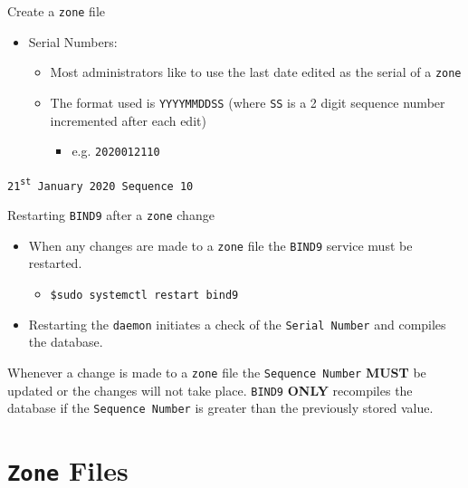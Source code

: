 \documentclass[xcolor=table]{beamer}
\begin{document}
\begin{frame}{Create a \texttt{zone} file}
  \begin{itemize}
    \item Serial Numbers:
      \begin{itemize}
        \item Most administrators like to use the last date edited as the serial of a \texttt{zone}
        \item The format used is \texttt{YYYYMMDDSS} (where \texttt{SS} is a 2 digit sequence number incremented after each edit)
          \begin{itemize}
            \item e.g. \texttt{2020012110}
          \end{itemize}
      \end{itemize}
  \end{itemize}
  \begin{tcolorbox}
    \begin{center}
      \texttt{21\textsuperscript{st} January 2020 Sequence 10}
    \end{center}
  \end{tcolorbox}
\end{frame}

\begin{frame}{Restarting \texttt{BIND9} after a \texttt{zone} change}
  \begin{itemize}
    \item When any changes are made to a \texttt{zone} file the \texttt{BIND9} service must be restarted.
      \begin{itemize}
        \item \texttt{\$sudo systemctl restart bind9}
      \end{itemize}
    \item Restarting the \texttt{daemon} initiates a check of the \texttt{Serial Number} and compiles the database.
  \end{itemize}
  \begin{tcolorbox}[title={\textbf{NOTE:}}]
    Whenever a change is made to a \texttt{zone} file the \texttt{Sequence Number} \textbf{MUST} be updated or the changes will not take place. \texttt{BIND9} \textbf{ONLY} recompiles the database if the \texttt{Sequence Number} is greater than the previously stored value.
  \end{tcolorbox}
\end{frame}

\section{\texttt{Zone} Files}
\end{document}
